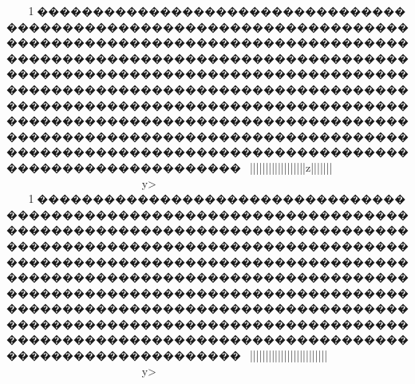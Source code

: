 {{{{{{{{{{{{{{{{{{{{{{{{{{{{{{{{{{{{{{{{{{{{{{{{{{{{{{{{{{{{{{{{{{{{{{{{{{{{{{{{{{{{{{{{{{{{{{{{{{{{{{{{{{{{{{{{{{{{{{{{{{{{{{{{{{{{{{{{{{{{{{{{{{{{{{{{{{{{{{{{{{{{{{{{{{{{{{{{{{{{{{{{{{{{{{{{{{{{{{{{{{{{{{{{{{{{{{{{{{{{{{{{{{{{{{{{{{{{{{{{{{{{{{{{{{{{{{{{{{{{{{{{{{{{{{{{{{{{{{{{{{{{{{{{{{{{{{{{{{{{{{{{{{{{{{{{{{{{{{{{{{{{{{{{{{{{{{{{{{{{{{{{{{{{{{{{{{{{{{{{{{{{{{{{{{{{{{{{{{{{{{{{{{{{{{{{{{{{{{{{{{{{{{{{{{{{{{{{{{{{{{{{{{{{{{{{{{{{{{{{{{{{{{{{{{{{{{{{{{{{{{{{{{{{{{{{{{{{{{{{{{{{{{{{{{{{{{{{{{{{{{{{{{{{{{{{{{{{{{{{{{{{{{{{{{{{{{{{{{{{{{{{{{{{{{{{{{{{{{{{{{{{{{{{{{{{{{{{{{{{{{{{{{{{{{{{{{{{{{{{{{{{{{{{{{{{{{{{{{{{{{{{{{{{{{{{{{{{{{{{{{{{{{{{{{{{{{{{{{{{{{{{{{{{{{{{{{{{{{{{{{{{{{{{{{{{{{{{{{{{{{{{{{{{{{{{{{{{{{{{{{{{{{{{{{{{{{{{{{{{{{{{{{{{{{{{{{{{{{{{{{{{{{{{{{{{{{{{{{{{{{{{{{{{{{{{{{{{{{{{{{{{{{{{{{{{{{{{{{{{{{{{{{{{{{{{{{{{{{{{{{{{{{{{{{{{{{{{{{{{{{{{{{{{{{{{{{{{{{{{{{{{{{{{{{{{{{{{{{{{{{{{{{{{{{{{{{{{{{{{{{{{{{{{{{{{{{{{{{{{{{{{{{{{{{{{{{{{{{{{{{{{{{{{{{{{{{{{{{{{{{{{{{{{{{{{{{{1\ky������������������������������������������������������������������������������������������������������������������������������������������������������������������������������������������������������������������������������������������������������������������������������������������������������������������������������������������������������������������������������������������~}}||}}}}}||||||||||||||||{{{z||||{{{{{{|||}}}~~~~~~~~y>
1\ky������������������������������������������������������������������������������������������������������������������������������������������������������������������������������������������������������������������������������������������������������������������������������������������������������������������������������������������������������������������������������������������~}}||}}}}}||||||||||||||||{{{{||||{{{{{{|||}}}~~~~~~~~y>
}}}}}}}}}}}}}}}}}}}}}}}}}}}}}}}}}}}}}}}}}}}}}}}}}}}}}}}}}}}}}}}}}}}}}}}}}}}}}}}}}}}}}}}}}}}}}}}}}}}}}}}}}}}}}}}}}}}}}}}}}}}}}}}}}}}}}}}}}}}}}}}}}}}}}}}}}}}}}}}}}}}}}}}}}}}}}}}}}}}}}}}}}}}}}}}}}}}}}}}}}}}}}}}}}}}}}}}}}}}}}}}}}}}}}}}}}}}}}}}}}}}}}}}}}}}}}}}}}}}}}}}}}}}}}}}}}}}}}}}}}}}}}}}}}}}}}}}}}}}}}}}}}}}}}}}}}}}}}}}}}}}}}}}}}}}}}}}}}}}}}}}}}}}}}}}}}}}}}}}}}}}}}}}}}}}}}}}}}}}}}}}}}}}}}}}}}}}}}}}}}}}}}}}}}}}}}}}}}}}}}}}}}}}}}}}}}}}}}}}}}}}}}}}}}}}}}}}}}}}}}}}}}}}}}}}}}}}}}}}}}}}}}}}}}}}}}}}}}}}}}}}}}}}}}}}}}}}}}}}}}}}}}}}}}}}}}}}}}}}}}}}}}}}}}}}}}}}}}}}}}}}}}}}}}}}}}}}}}}}}}}}}}}}}}}}}}}}}}}}}}}}}}}}}}}}}}}}}}}}}}}}}}}}}}}}}}}}}}}}}}}}}}}}}}}}}}}}}}}}}}}}}}}}}}}}}}}}}}}}}}}}}}}}}}}}}}}}}}}}}}}}}}}}}}}}}}}}}}}}}}}}}}}}}}}}}}}}}}}}}}}}}}}}}}}}}}}}}}}}}}}}}}}}}}}}}}}}}}}}}}}}}}}}}}}}}}}}}}}}}}}}}}}}}}}}}}}}}}}}}}}}}}}}}}}}}}}}}}}}}}}}}}}}}}}}}}}}}}}}}}}}}}}}}}}}}}}}}}}}}}}}}}}}}}}}}}}}}}}}}}}}}}}}}}}}}}}}}}}}}}}}}}}}}}}}}}}}}}}}}}}}}}}}}}}}}}}}}}}}}}}}}}}}}}}}}}}}}}}}}}}}}}}}}}}}}}}
